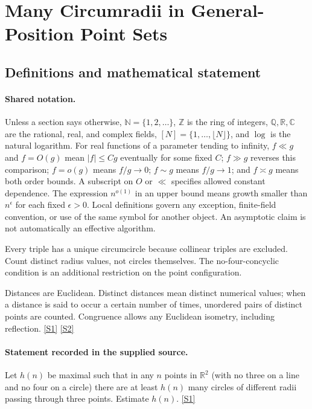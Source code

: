 \documentclass[11pt,a4paper]{article}
\newcommand{\N}{\mathbb{N}}
\newcommand{\Z}{\mathbb{Z}}
\newcommand{\Q}{\mathbb{Q}}
\newcommand{\R}{\mathbb{R}}
\newcommand{\C}{\mathbb{C}}
\newcommand{\sref}[2]{\hyperlink{source:#1:#2}{[S#2]}}
\begin{document}
\section{Many Circumradii in General-Position Point Sets}\label{statement}


\subsection{Definitions and mathematical statement}

\paragraph{Shared notation.}Unless a section says otherwise, $\N=\{1,2,\ldots\}$,
$\Z$ is the ring of integers, $\Q,\R,\C$ are the rational, real, and complex
fields, $[N]=\{1,\ldots,\lfloor N\rfloor\}$, and $\log$ is the natural
logarithm. For real functions of a parameter tending to infinity,
$f\ll g$ and $f=O(g)$ mean $|f|\leq Cg$ eventually for some fixed $C$;
$f\gg g$ reverses this comparison; $f=o(g)$ means $f/g\to0$;
$f\sim g$ means $f/g\to1$; and $f\asymp g$ means both order bounds.
A subscript on $O$ or $\ll$ specifies allowed constant dependence.
The expression $n^{o(1)}$ in an upper bound means growth smaller than
$n^\epsilon$ for each fixed $\epsilon>0$. Local definitions govern any
exception, finite-field convention, or use of the same symbol for another
object. An asymptotic claim is not automatically an effective algorithm.



Every triple has a unique circumcircle because collinear triples are excluded. Count distinct radius values, not circles themselves. The no-four-concyclic condition is an additional restriction on the point configuration.

Distances are Euclidean. Distinct distances mean distinct numerical values; when a distance is said to occur a certain number of times, unordered pairs of distinct points are counted. Congruence allows any Euclidean isometry, including reflection. \sref{statement}{1} \sref{statement}{2}

\paragraph{Statement recorded in the supplied source.}
Let $h(n)$ be maximal such that in any $n$ points in $\mathbb{R}^2$ (with no three on a line and no four on a circle) there are at least $h(n)$ many circles of different radii passing through three points. Estimate $h(n)$. \sref{statement}{1}
\end{document}
